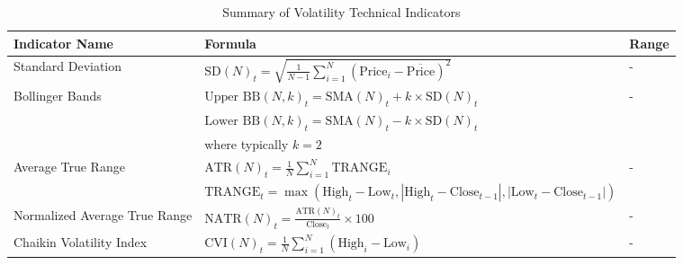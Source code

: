 \begin{table}[htb!]
\caption{Summary of Volatility Technical Indicators}
\label{Tables:VolatilityIndicators}
\centering
\footnotesize
\begin{tabularx}{\textwidth}{@{}lXl@{}}
\toprule
\textbf{Indicator Name} & \textbf{Formula} & \textbf{Range} \\ 
\midrule
Standard Deviation & $\text{SD}(N)_t = \sqrt{\frac{1}{N-1} \sum_{i=1}^{N} (\text{Price}_i - \overline{\text{Price}})^2}$ & - \\
\addlinespace
Bollinger Bands & $\text{Upper BB}(N, k)_t = \text{SMA}(N)_t + k \times \text{SD}(N)_t$ & - \\
\addlinespace
& $\text{Lower BB}(N, k)_t = \text{SMA}(N)_t - k \times \text{SD}(N)_t$ & \\
\addlinespace
& where typically $ k = 2 $& \\
\addlinespace
Average True Range & $\text{ATR}(N)_t = \frac{1}{N} \sum_{i=1}^{N} \text{TRANGE}_i$ & - \\
\addlinespace
& $\text{TRANGE}_t = \max(\text{High}_t - \text{Low}_t, |\text{High}_t - \text{Close}_{t-1}|, |\text{Low}_t - \text{Close}_{t-1}|)$ & \\
\addlinespace
Normalized Average True Range & $\text{NATR}(N)_t = \frac{\text{ATR}(N)_t}{\text{Close}_t} \times 100$ & - \\
\addlinespace
Chaikin Volatility Index & $\text{CVI}(N)_t = \frac{1}{N} \sum_{i=1}^{N} (\text{High}_i - \text{Low}_i)$ & - \\
\bottomrule
\end{tabularx}
\end{table}
